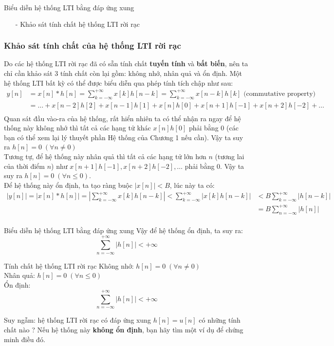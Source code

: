 \documentclass[8pt]{beamer}
\begin{document}
\begin{frame}{Biểu diễn hệ thống LTI bằng đáp ứng xung}
\begin{itemize}
	\item[-] Khảo sát tính chất hệ thống LTI rời rạc
\end{itemize}
\subsubsection{Khảo sát tính chất của hệ thống LTI rời rạc}
 Do các hệ thống LTI rời rạc đã có sẵn tính chất \textbf{tuyến tính} và \textbf{bất biến}, nên ta chỉ cần khảo sát $3$ tính chất còn lại gồm: \alert{không nhớ}, \alert{nhân quả} và \alert{ổn định}. Một hệ thống LTI bất kỳ có thể được biểu diễn qua phép tính tích chập như sau:
 \begin{equation*}
	 \begin{split}
		 y[n]&=x[n]*h[n]=\sum_{k=-\infty}^{+\infty}x[k]h[n-k]=\sum_{k=-\infty}^{+\infty}x[n-k]h[k] \text{     (commutative property)}\\
		     &=\dots+x[n-2]h[2]+x[n-1]h[1]+x[n]h[0]+x[n+1]h[-1]+x[n+2]h[-2]+\dots \\
	\end{split}
\end{equation*}
Quan sát đầu vào-ra của hệ thống, rất hiển nhiên ta có thể nhận ra ngay để hệ thống này \alert{không nhớ} thì tất cả các hạng tử khác $x[n]h[0]$ phải bằng $0$ (các bạn có thể xem lại lý thuyết phần \alert{Hệ thống} của \alert{Chương 1} nếu cần). Vậy ta suy ra $h[n]=0 \;(\forall n\neq 0 )$
\\ Tương tự, để hệ thống này \alert{nhân quả} thì tất cả các hạng tử lớn hơn $n$ (tương lai của thời điểm $n$) như $x[n+1]h[-1],x[n+2]h[-2],\dots$ phải bằng $0$. Vậy ta suy ra $h[n]=0\;(\forall n\leq0)$.
\\ Để hệ thống này \alert{ổn định}, ta tạo ràng buộc $|x[n]|<B$, lúc này ta có:
\begin{equation*}
\begin{split}
	|y[n]|=|x[n]*h[n]|=\left|\sum_{k=-\infty}^{+\infty}x[k]h[n-k]\right|<\sum_{k=-\infty}^{+\infty}\left|x[k]h[n-k]\right|&<B\sum_{k=-\infty}^{+\infty}|h[n-k]| \\
	      &= B\sum_{n=-\infty}^{+\infty}|h[n]|\\
\end{split}
\end{equation*}
\end{frame}
\begin{frame}{Biểu diễn hệ thống LTI bằng đáp ứng xung}
	Vậy để hệ thống \alert{ổn định}, ta suy ra: $$\sum_{n=-\infty}^{+\infty}|h[n]|<+\infty$$
	\begin{block}{Tính chất hệ thống LTI rời rạc}
Không nhớ: $h[n]=0\;(\forall n \neq 0)$\\
Nhân quả: $h[n]=0\;(\forall n\leq0)$\\
Ổn định: 
$$\sum_{n=-\infty}^{+\infty}|h[n]|<+\infty$$
\end{block}
Suy ngẫm: hệ thống LTI rời rạc có đáp ứng xung $h[n]=u[n]$ có những tính chất nào ? Nếu hệ thống này \textbf{không ổn định}, bạn hãy tìm một ví dụ để chứng minh điều đó.
\end{frame}
\end{document}
